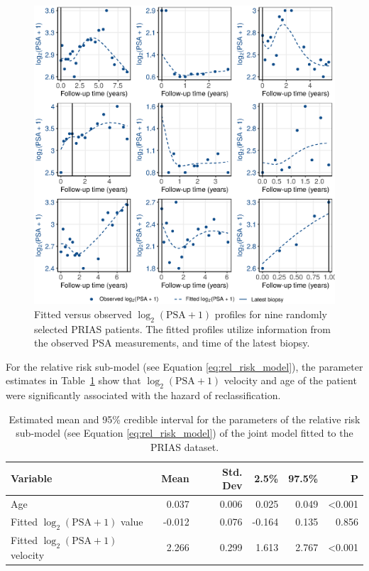 \begin{figure}
\centerline{\includegraphics[width=\columnwidth]{images/fitted_9subject_psa.eps}}
\caption{Fitted versus observed ${\log_2 (\mbox{PSA} + 1)}$ profiles for nine randomly selected PRIAS patients. The fitted profiles utilize information from the observed PSA measurements, and time of the latest biopsy.}
\label{fig:fitted_9subject_psa}
\end{figure}

For the relative risk sub-model (see Equation \ref{eq:rel_risk_model}), the parameter estimates in Table~\ref{tab:PSA_survival} show that ${\log_2 (\mbox{PSA} + 1)}$ velocity and age of the patient were significantly associated with the hazard of reclassification.

\begin{table}
\small\sf\centering
\caption{Estimated mean and 95\% credible interval for the parameters of the relative risk sub-model (see Equation \ref{eq:rel_risk_model}) of the joint model fitted to the PRIAS dataset.}
\label{tab:PSA_survival}
\begin{tabular}{lrrrrr}
\hline
Variable                      & Mean   & Std. Dev & 2.5\%  & 97.5\%                 & P              \\
\hline
Age                      & 0.037    & 0.006 & 0.025  & 0.049  & \textless0.001 \\
Fitted $\log_2 (\mbox{PSA} + 1)$ value            & -0.012   & 0.076 & -0.164 & 0.135  & 0.856 \\
Fitted $\log_2 (\mbox{PSA} + 1)$ velocity             & 2.266    & 0.299 & 1.613  & 2.767  & \textless0.001   \\
\hline
\end{tabular}
\end{table}

